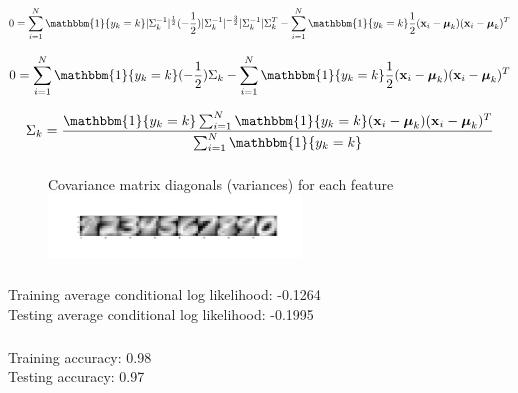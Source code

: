\documentclass[12pt,letterpaper]{article} %
\newcommand{\bs}[1]{\bm{\mathrm{#1}}} %
\newcommand{\switch}[0]{\mathbbm{1}\{y_k=k\}}
\begin{document}
  \begin{equation*} 
   0 = \sum^N_{i=1}\switch|\Sigma_k^{-1}|^{\frac{1}{2}}(-\frac{1}{2})|\Sigma_k^{-1}|^{-\frac{3}{2}}|\Sigma_{k}^{-1}|\Sigma_{k}^{T}- \sum^N_{i=1}\switch{}\frac{1}{2}(\bs{x}_i-\bs{\mu}_k)(\bs{x}_i -\bs{\mu}_k)^T 
  \end{equation*}

  \begin{equation*} 
   0 = \sum^N_{i=1}\switch(-\frac{1}{2})\Sigma_{k}- \sum^N_{i=1}\switch{}\frac{1}{2}(\bs{x}_i-\bs{\mu}_k)(\bs{x}_i -\bs{\mu}_k)^T 
  \end{equation*}

  \begin{equation*} 
   \Sigma_{k} = \frac{\switch \sum^N_{i=1}\switch{}(\bs{x}_i-\bs{\mu}_k)(\bs{x}_i -\bs{\mu}_k)^T }{\sum^N_{i=1}\switch}
  \end{equation*}
  
   \clearpage
  
  \subsubsection{}{}
  \begin{figure}[!h]
  \centering
  \caption{}{  Covariance matrix diagonals (variances) for each feature}
   \includegraphics[width=0.6\textwidth, trim={3in 0in 0in 0in},clip=true ]{q2_2_eta.png}
\end{figure}
\FloatBarrier

  \subsubsection{}
  Training average conditional log likelihood: -0.1264 \\
  Testing average conditional log likelihood: -0.1995\\
  \subsubsection{}
  Training accuracy: 0.98\\
  Testing accuracy: 0.97
 \subsection{}
 
\end{document}
